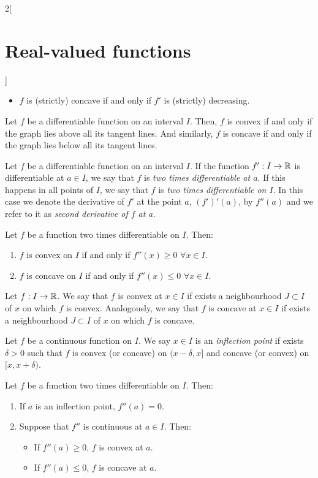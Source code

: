 \documentclass[../../../main.tex]{subfiles}
\begin{document}
\begin{multicols}{2}[\section{Real-valued functions}]
\begin{theorem}
\begin{itemize}
        \item $f$ is (strictly) concave if and only if $f'$ is (strictly) decreasing.
    \end{itemize}
\end{theorem}
\begin{theorem}
    Let $f$ be a differentiable function on an interval $I$. Then, $f$ is convex if and only if the graph lies above all its tangent lines. And similarly, $f$ is concave if and only if the graph lies below all its tangent lines.
\end{theorem}
\begin{definition}\label{RVF-second_derivative}
    Let $f$ be a differentiable function on an interval $I$. If the function $f':I\rightarrow\mathbb{R}$ is differentiable at $a\in I$, we say that $f$ is \textit{two times differentiable at $a$}. If this happens in all points of $I$, we say that $f$ is \textit{two times differentiable on $I$}. In this case we denote the derivative of $f'$ at the point $a$, $(f')'(a)$, by $f''(a)$ and we refer to it as \textit{second derivative of $f$ at $a$}.
\end{definition}
\begin{theorem}
    Let $f$ be a function two times differentiable on $I$. Then:
    \begin{enumerate}
        \item $f$ is convex on $I$ if and only if $f''(x)\geq 0$ $\forall x\in I$.
        \item $f$ is concave on $I$ if and only if $f''(x)\leq 0$ $\forall x\in I$.
    \end{enumerate}
\end{theorem}
\begin{definition}
    Let $f:I\rightarrow\mathbb{R}$. We say that $f$ is convex at $x\in I$ if exists a neighbourhood $J\subset I$ of $x$ on which $f$ is convex. Analogously, we say that $f$ is concave at $x\in I$ if exists a neighbourhood $J\subset I$ of $x$ on which $f$ is concave. 
\end{definition}
\begin{definition}
    Let $f$ be a continuous function on $I$. We say $x\in I$ is an \textit{inflection point} if exists $\delta>0$ such that $f$ is convex (or concave) on $(x-\delta,x]$ and concave (or convex) on $[x,x+\delta)$.
\end{definition}
\begin{prop}
    Let $f$ be a function two times differentiable on $I$. Then:
    \begin{enumerate}
        \item If $a$ is an inflection point, $f''(a)=0$.
        \item Suppose that $f''$ is continuous at $a\in I$. Then:
        \begin{itemize}
            \item If $f''(a)\geq 0$, $f$ is convex at $a$.
            \item If $f''(a)\leq 0$, $f$ is concave at $a$.
        \end{itemize}
    \end{enumerate}
\end{prop}

\end{multicols}
\end{document}
